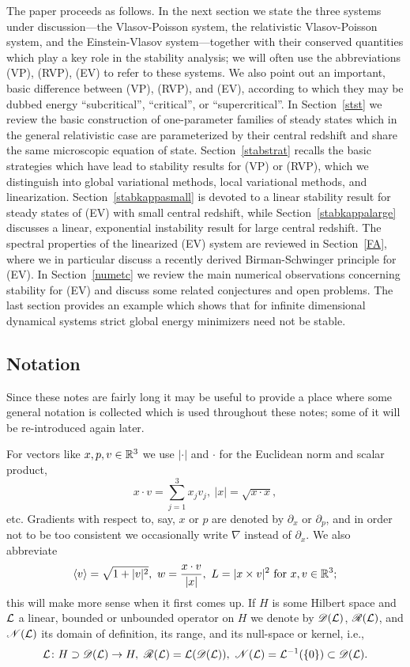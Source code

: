 \documentclass[11pt]{article}
\begin{document}
The paper proceeds as follows. In the next section we state the three systems
under discussion---the Vlasov-Poisson system, the relativistic Vlasov-Poisson
system, and the Einstein-Vlasov system---together with their conserved
quantities which play
a key role in the stability analysis; we will often
use the abbreviations (VP), (RVP), (EV) to refer to these systems.
We also point out an important,
basic difference between (VP), (RVP), and (EV), according to which
they may be dubbed energy ``subcritical'', ``critical'', or ``supercritical''.
In Section~\ref{stst} we review the basic construction of one-parameter
families of steady states which in the general relativistic
case are parameterized by their central
redshift and share the same microscopic equation of state.
Section~\ref{stabstrat} recalls the basic strategies which have lead
to stability results for (VP) or (RVP), which we distinguish into
global variational methods, local variational methods, and linearization.
Section~\ref{stabkappasmall} is devoted to a linear stability result for
steady states of (EV) with small central redshift,
while Section~\ref{stabkappalarge} discusses a linear, exponential
instability result for large central redshift.
The spectral properties
of the linearized (EV) system are reviewed in Section~\ref{FA},
where we in particular discuss a recently derived Birman-Schwinger principle
for (EV). In Section~\ref{numetc} we review the main numerical
observations concerning stability for (EV) and discuss some related
conjectures and open problems. The last section provides an example
which shows that for infinite dimensional dynamical systems
strict global energy minimizers need not be stable.
%
\subsection*{Notation}
%
Since these notes are fairly long it may be useful to provide a place where
some general notation is collected which is used throughout these notes;
some of it will be re-introduced again later.

For vectors like $x,p,v \in \mathbb R^3$ we use $|\cdot|$ and $\cdot$ for the
Euclidean norm and scalar product,
\[
x\cdot v = \sum_{j=1}^3 x_j v_j,\ |x| = \sqrt{x\cdot x},
\]
etc. Gradients with respect to, say, $x$ or $p$ are denoted by
$\partial_x$ or $\partial_p$, and in order not to be too consistent
we occasionally write $\nabla$ instead of $\partial_x$. We also abbreviate
\[
\left\langle v\right\rangle = \sqrt{1+|v|^2},\ w = \frac{x\cdot v}{|x|},\ L= |x\times v|^2\
\mbox{for}\ x,v \in \mathbb R^3; 
\]
this will make more sense when it first comes up. If $H$ is some Hilbert
space and ${\cal L}$ a linear, bounded or unbounded operator on $H$ we
denote by ${\mathscr D}({\cal L})$, ${\mathscr R}({\cal L})$, and ${\mathscr N}({\cal L})$ its domain of definition,
its range, and its null-space or kernel, i.e.,
\[
{\cal L}\colon H\supset {\mathscr D}({\cal L})\to H,\ {\mathscr R}({\cal L}) = {\cal L}({\mathscr D}({\cal L})),\
{\mathscr N}({\cal L}) = {\cal L}^{-1}(\{0\})\subset {\mathscr D}({\cal L}).
\]
%
\end{document}
